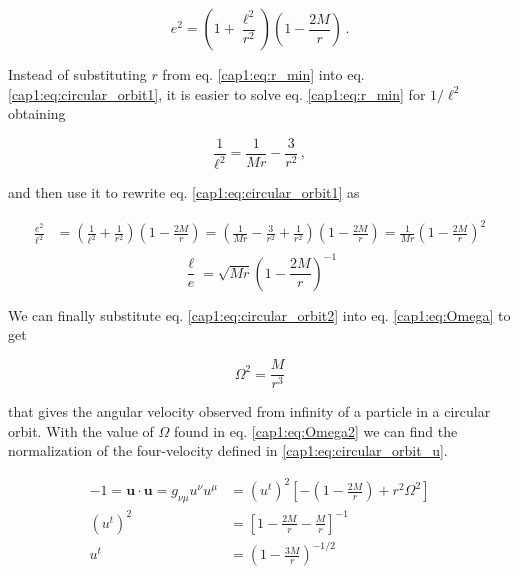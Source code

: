 \begin{equation}
    e^2 = \left(1 + \frac{\ell^2}{r^2} \right)
    \left(1 - \frac{2M}{r}\right) \, .
    \label{cap1:eq:circular_orbit1}
\end{equation}

Instead of substituting $r$ from eq. \ref{cap1:eq:r_min} into eq.
\ref{cap1:eq:circular_orbit1}, it is easier to solve eq. \ref{cap1:eq:r_min} for
$1 / \ell^2$ obtaining

\begin{equation}
    \frac{1}{\ell^2} = \frac{1}{M r} - \frac{3}{r^2} \, ,
\end{equation}

and then use it to rewrite eq. \ref{cap1:eq:circular_orbit1} as

\begin{align*}
    \frac{e^2}{\ell^2} &= \left(\frac{1}{\ell^2} + \frac{1}{r^2} \right)
    \left(1 - \frac{2M}{r}\right)
    = \left(\frac{1}{M r}
    - \frac{3}{r^2}
    + \frac{1}{r^2}\right)
    \left(1 - \frac{2M}{r}\right) 
    = \frac{1}{M r} \left(1
    - \frac{2 M}{r} \right)^2 \\
\end{align*}
\begin{equation}
    \frac{\ell}{e} = \sqrt{M r} \left(1
    - \frac{2 M}{r} \right)^{-1}
    \label{cap1:eq:circular_orbit2}
\end{equation}

We can finally substitute eq. \ref{cap1:eq:circular_orbit2} into eq.
\ref{cap1:eq:Omega} to get

\begin{equation}
    \Omega^2 = \frac{M}{r^3}
    \label{cap1:eq:Omega2}
\end{equation}

that gives the angular velocity observed from infinity of a particle in a
circular orbit.
With the value of $\Omega$ found in eq. \ref{cap1:eq:Omega2} we can find the
normalization of the four-velocity defined in \ref{cap1:eq:circular_orbit_u}.

\begin{align*}
    - 1 = \mathbf{u \cdot u} = g_{\nu \mu} u^\nu u^\mu
    &= (u^t)^2 \left[- \left(1 - \frac{2M}{r}\right) + r^2 \Omega^2 \right] \\
    (u^t)^2 &= \left[ 1 - \frac{2M}{r} - \frac{M}{r}\right]^{-1} \\
    u^t &= \left( 1 - \frac{3M}{r} \right)^{-1/2} \\
\end{align*}

